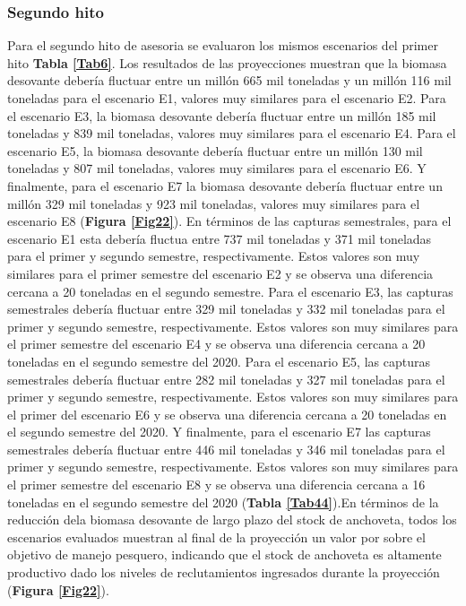 \documentclass[letter,11pt]{article}
\begin{document}
\pagebreak


\subsubsection{Segundo hito}


Para el segundo hito de asesoria se evaluaron los mismos escenarios del
primer hito \textbf{Tabla \ref{Tab6}}. Los resultados de las
proyecciones muestran que la biomasa desovante deber\'ia fluctuar entre un
mill\'on 665 mil toneladas y un mill\'on 116 mil toneladas para el escenario
E1, valores muy similares para el escenario E2. Para el escenario E3, la
biomasa desovante deber\'ia fluctuar entre un mill\'on 185 mil toneladas y
839 mil toneladas, valores muy similares para el escenario E4. Para el escenario
E5, la biomasa desovante deber\'ia fluctuar entre un mill\'on 130 mil toneladas
y 807 mil toneladas, valores muy similares para el escenario E6. Y finalmente,
para el escenario E7 la biomasa desovante deber\'ia fluctuar entre un mill\'on
329 mil toneladas y 923 mil toneladas, valores muy similares para el escenario E8
(\textbf{Figura \ref{Fig22}}). En t\'erminos de las capturas semestrales, para el
escenario E1 esta deber\'ia  fluctua entre 737 mil toneladas y 371 mil toneladas
para el primer y segundo semestre, respectivamente. Estos valores son muy similares
para el primer semestre del escenario E2 y se observa una diferencia cercana
a 20 toneladas en el segundo semestre. Para el escenario E3, las capturas
semestrales deber\'ia fluctuar entre 329 mil toneladas y 332 mil toneladas para
el primer y segundo semestre, respectivamente. Estos valores son muy
similares para el primer semestre del escenario E4 y se observa una
diferencia cercana a 20 toneladas en el segundo semestre del 2020. Para el
escenario E5, las capturas semestrales deber\'ia fluctuar entre 282 mil toneladas
y 327 mil toneladas para el primer y segundo semestre, respectivamente. Estos
valores son muy similares para el primer del escenario E6 y se observa una diferencia
cercana a 20 toneladas en el segundo semestre del 2020. Y finalmente, para el
escenario E7 las capturas semestrales deber\'ia fluctuar entre 446 mil toneladas y
346 mil toneladas para el primer y segundo semestre, respectivamente. Estos valores
son muy similares para el primer semestre del escenario E8 y se observa una diferencia
cercana a 16 toneladas en el segundo semestre del 2020 (\textbf{Tabla \ref{Tab44}}).En
t\'erminos de la reducci\'on dela biomasa desovante de largo plazo del stock de
anchoveta, todos los escenarios evaluados muestran al final de la proyecci\'on un valor
por sobre el objetivo de manejo pesquero, indicando que el stock de anchoveta es
altamente productivo dado los niveles de reclutamientos ingresados
durante la proyecci\'on (\textbf{Figura \ref{Fig22}}).\\
\end{document}
